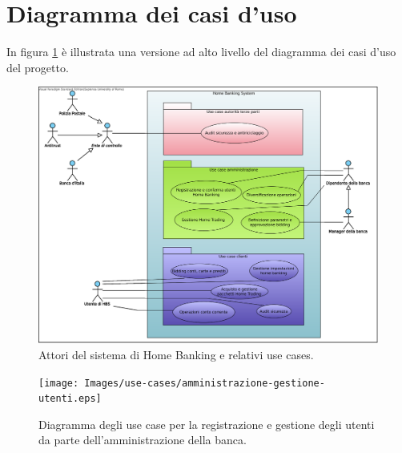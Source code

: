\section{Diagramma dei casi d'uso}

In figura \ref{fig:use-cases} \`e illustrata una versione ad alto livello del diagramma dei casi d'uso del progetto.

\begin{figure}
	\centering
	\includegraphics[width=\textwidth]{Images/Home_Banking_inception_use_cases.eps}
	\caption{Attori del sistema di Home Banking e relativi use cases.}
	\label{fig:use-cases}
\end{figure}

\begin{figure}
	\centering
	\texttt{[image: Images/use-cases/amministrazione-gestione-utenti.eps]}
	\caption{Diagramma degli use case per la registrazione e gestione degli utenti da parte dell'amministrazione della banca.}
	\label{fig:use-cases:amministrazione:gestione-utenti}
\end{figure}

